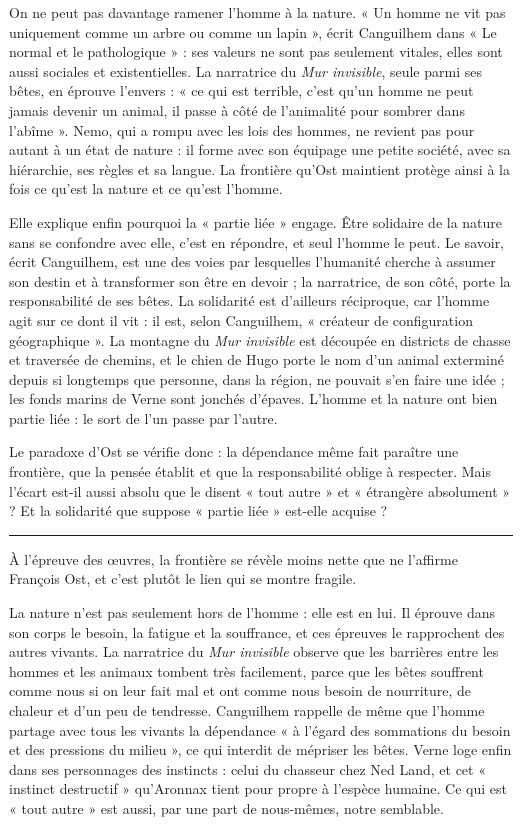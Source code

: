 \documentclass[11pt,a4paper]{article}
\begin{document}
On ne peut pas davantage ramener l'homme à la nature. « Un homme ne vit pas uniquement comme un arbre ou comme un lapin », écrit Canguilhem dans « Le normal et le pathologique » : ses valeurs ne sont pas seulement vitales, elles sont aussi sociales et existentielles. La narratrice du \emph{Mur invisible}, seule parmi ses bêtes, en éprouve l'envers : « ce qui est terrible, c'est qu'un homme ne peut jamais devenir un animal, il passe à côté de l'animalité pour sombrer dans l'abîme ». Nemo, qui a rompu avec les lois des hommes, ne revient pas pour autant à un état de nature : il forme avec son équipage une petite société, avec sa hiérarchie, ses règles et sa langue. La frontière qu'Ost maintient protège ainsi à la fois ce qu'est la nature et ce qu'est l'homme.

Elle explique enfin pourquoi la « partie liée » engage. Être solidaire de la nature sans se confondre avec elle, c'est en répondre, et seul l'homme le peut. Le savoir, écrit Canguilhem, est une des voies par lesquelles l'humanité cherche à assumer son destin et à transformer son être en devoir ; la narratrice, de son côté, porte la responsabilité de ses bêtes. La solidarité est d'ailleurs réciproque, car l'homme agit sur ce dont il vit : il est, selon Canguilhem, « créateur de configuration géographique ». La montagne du \emph{Mur invisible} est découpée en districts de chasse et traversée de chemins, et le chien de Hugo porte le nom d'un animal exterminé depuis si longtemps que personne, dans la région, ne pouvait s'en faire une idée ; les fonds marins de Verne sont jonchés d'épaves. L'homme et la nature ont bien partie liée : le sort de l'un passe par l'autre.

Le paradoxe d'Ost se vérifie donc : la dépendance même fait paraître une frontière, que la pensée établit et que la responsabilité oblige à respecter. Mais l'écart est-il aussi absolu que le disent « tout autre » et « étrangère absolument » ? Et la solidarité que suppose « partie liée » est-elle acquise ?

\begin{center}\rule{0.5\linewidth}{0.5pt}\end{center}

À l'épreuve des œuvres, la frontière se révèle moins nette que ne l'affirme François Ost, et c'est plutôt le lien qui se montre fragile.

La nature n'est pas seulement hors de l'homme : elle est en lui. Il éprouve dans son corps le besoin, la fatigue et la souffrance, et ces épreuves le rapprochent des autres vivants. La narratrice du \emph{Mur invisible} observe que les barrières entre les hommes et les animaux tombent très facilement, parce que les bêtes souffrent comme nous si on leur fait mal et ont comme nous besoin de nourriture, de chaleur et d'un peu de tendresse. Canguilhem rappelle de même que l'homme partage avec tous les vivants la dépendance « à l'égard des sommations du besoin et des pressions du milieu », ce qui interdit de mépriser les bêtes. Verne loge enfin dans ses personnages des instincts : celui du chasseur chez Ned Land, et cet « instinct destructif » qu'Aronnax tient pour propre à l'espèce humaine. Ce qui est « tout autre » est aussi, par une part de nous-mêmes, notre semblable.
\end{document}
